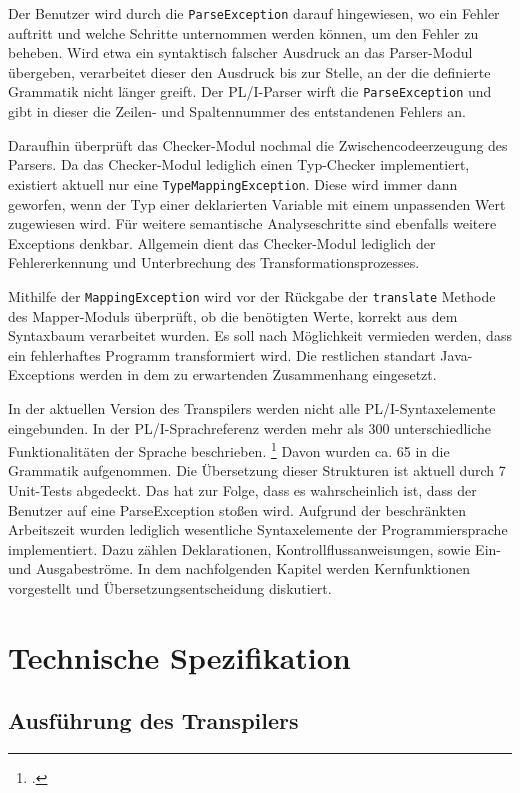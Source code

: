Der Benutzer wird durch die \verb+ParseException+ darauf hingewiesen, wo ein Fehler auftritt und welche Schritte unternommen werden können, um den Fehler zu beheben.
Wird etwa ein syntaktisch falscher Ausdruck an das Parser-Modul übergeben, verarbeitet dieser den Ausdruck
bis zur Stelle, an der die definierte Grammatik nicht länger greift.
Der PL/I-Parser wirft die \verb+ParseException+ und gibt in dieser die Zeilen- und Spaltennummer des entstandenen Fehlers an.

Daraufhin überprüft das Checker-Modul nochmal die Zwischencodeerzeugung des Parsers.
Da das Checker-Modul lediglich einen Typ-Checker implementiert, existiert aktuell nur eine \verb+TypeMappingException+.
Diese wird immer dann geworfen, wenn der Typ einer deklarierten Variable mit einem unpassenden Wert zugewiesen wird.
Für weitere semantische Analyseschritte sind ebenfalls weitere Exceptions denkbar. Allgemein dient das Checker-Modul lediglich der Fehlererkennung und Unterbrechung des Transformationsprozesses.

Mithilfe der \verb+MappingException+ wird vor der Rückgabe der \verb+translate+ Methode des Mapper-Moduls überprüft, ob 
die benötigten Werte, korrekt aus dem Syntaxbaum verarbeitet wurden.
Es soll nach Möglichkeit vermieden werden, dass ein fehlerhaftes Programm transformiert wird. Die restlichen standart Java-Exceptions werden in dem zu erwartenden Zusammenhang eingesetzt.

In der aktuellen Version des Transpilers werden nicht alle PL/I-Syntaxelemente eingebunden.
In der PL/I-Sprachreferenz werden mehr als 300 unterschiedliche Funktionalitäten der Sprache beschrieben. \footcite[Vgl. ][S. 5ff.]{pliref}
Davon wurden ca. 65 in die Grammatik aufgenommen. Die Übersetzung dieser Strukturen ist aktuell durch 7 Unit-Tests abgedeckt.
Das hat zur Folge, dass es wahrscheinlich ist, dass der Benutzer auf eine ParseException stoßen wird.
Aufgrund der beschränkten Arbeitszeit wurden lediglich wesentliche Syntaxelemente der Programmiersprache implementiert.
Dazu zählen Deklarationen, Kontrollflussanweisungen, sowie Ein- und Ausgabeströme.
In dem nachfolgenden Kapitel werden Kernfunktionen vorgestellt und Übersetzungsentscheidung diskutiert. 

\pagebreak
\section{Technische Spezifikation}
\subsection{Ausführung des Transpilers}

